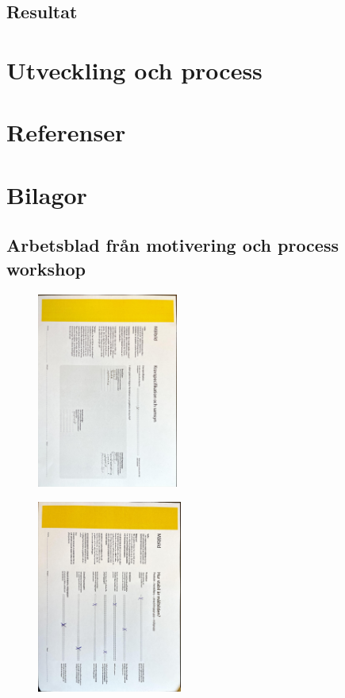 \documentclass{article}
\begin{document}
\subsection{Resultat}

\section{Utveckling och process}


\section{Referenser}

\section{Bilagor}
\subsection{Arbetsblad från motivering och process workshop}


\begin{figure}[htp]
    \centering
    \includegraphics[width = 175px,angle=90]{KS.jpg}
    \label{fig:24}
\end{figure}

\begin{figure}[htp]
    \centering
    \includegraphics[width = 180px,angle=90]{SM.jpg}
    \label{fig:24}
\end{figure}
\end{document}
